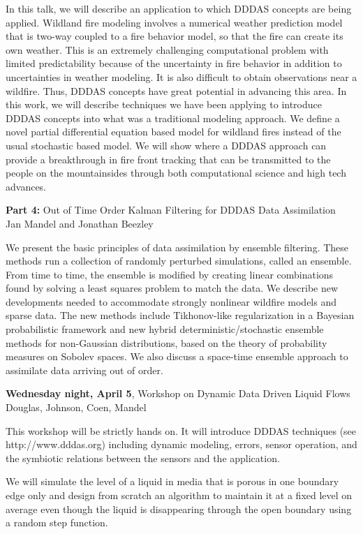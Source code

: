 \documentclass[twosided]{report}
\begin{document}
In this talk, we will describe an application to which DDDAS
concepts are being applied.  Wildland fire modeling involves
a numerical weather prediction model that is two-way coupled
to a fire behavior model, so that the fire can create its
own weather.  This is an extremely challenging computational
problem with limited predictability because of the
uncertainty in fire behavior in addition to uncertainties in
weather modeling.  It is also difficult to obtain
observations near a wildfire.  Thus, DDDAS concepts have
great potential in advancing this area.  In this work, we
will describe techniques we have been applying to introduce
DDDAS concepts into what was a traditional modeling
approach.  We define a novel partial differential equation
based model for wildland fires instead of the usual
stochastic based model.  We will show where a DDDAS approach
can provide a breakthrough in fire front tracking that can
be transmitted to the people on the mountainsides through
both computational science and high tech advances.

{\bf Part 4:} Out of Time Order Kalman Filtering for DDDAS Data
Assimilation
\\
Jan Mandel and Jonathan Beezley

We present the basic principles of data assimilation by
ensemble filtering.  These methods run a collection of
randomly perturbed simulations, called an ensemble.  From
time to time, the ensemble is modified by creating linear
combinations found by solving a least squares problem to
match the data.  We describe new developments needed to
accommodate strongly nonlinear wildfire models and sparse
data.  The new methods include Tikhonov-like regularization
in a Bayesian probabilistic framework and new hybrid
deterministic/stochastic ensemble methods for non-Gaussian
distributions, based on the theory of probability measures
on Sobolev spaces.  We also discuss a space-time ensemble
approach to assimilate data arriving out of order.

{\bf Wednesday night, April 5},
Workshop on Dynamic Data Driven Liquid Flows
\\ Douglas, Johnson, Coen, Mandel

This workshop will be strictly hands on.  It will introduce
DDDAS techniques (see http://www.dddas.org) including
dynamic modeling, errors, sensor operation, and the
symbiotic relations between the sensors and the application.

We will simulate the level of a liquid in media that is
porous in one boundary edge only and design from scratch an
algorithm to maintain it at a fixed level on average even
though the liquid is disappearing through the open boundary
using a random step function.
\end{document}
